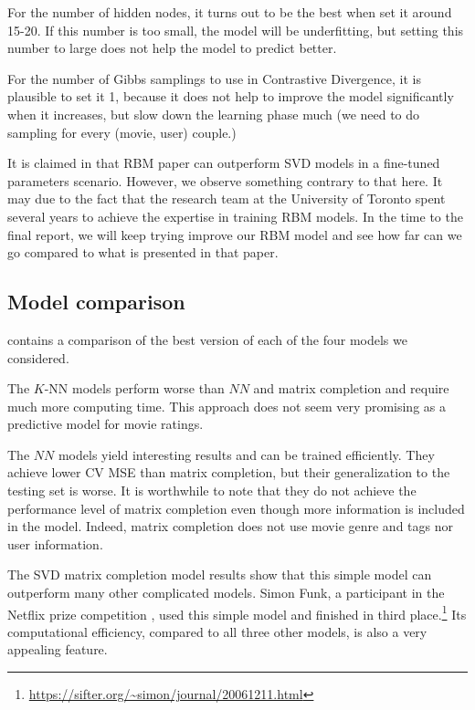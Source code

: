 \documentclass[bj, preprint]{imsart}
\begin{document}
For the number of hidden nodes, it turns out to be the best when set it around 15-20. If this number is too small, the model will be underfitting, but setting this number to large does not help the model to predict better.

For the number of Gibbs samplings to use in Contrastive Divergence, it is plausible to set it 1, because it does not help to improve the model significantly when it increases, but slow down the learning phase much (we need to do sampling for every (movie, user) couple.)

It is claimed in \cite{10.1145/1273496.1273596} that RBM paper can outperform SVD models in a fine-tuned parameters scenario. However, we observe something contrary to that here. It may due to the fact that the research team at the University of Toronto spent several years to achieve the expertise in training RBM models. In the time to the final report, we will keep trying improve our RBM model and see how far can we go compared to what is presented in that paper.



\subsection{Model comparison}\label{sebsec:results.model}

 contains a comparison of the best version of each of the four models we considered. 

The $K$-NN models perform worse than $NN$ and matrix completion and require much more computing time. This approach does not seem very promising as a predictive model for movie ratings.

The $NN$ models yield interesting results and can be trained efficiently. They achieve lower CV MSE than matrix completion, but their generalization to the testing set is worse. It is worthwhile to note that they do not achieve the performance level of matrix completion even though more information is included in the model. Indeed, matrix completion does not use movie genre and tags nor user information.

The SVD matrix completion model results show that this simple model can outperform many other complicated models. Simon Funk, a participant in the Netflix prize competition \citep{bennett2007netflix}, used this simple model and finished in third place.\footnote{\url{https://sifter.org/~simon/journal/20061211.html}} Its computational efficiency, compared to all three other models, is also a very appealing feature.
\end{document}
